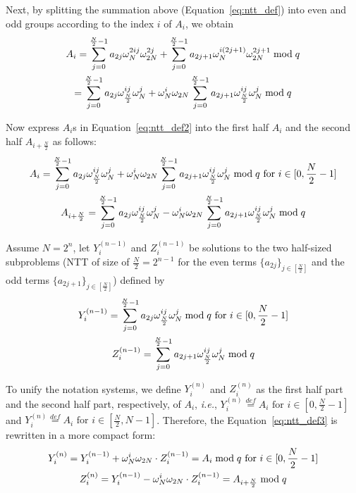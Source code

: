 \documentclass{iacrtrans}
\theoremstyle{plain}
\begin{document}
Next, by splitting the summation above (Equation~\ref{eq:ntt_def}) into even and odd groups according to the index $i$ of $A_i$, we obtain
\begin{gather}
    A_i = \sum_{j=0}^{\frac{N}{2}-1}a_{2j}\omega_N^{2ij}\omega_{2N}^{2j}  + \sum_{j=0}^{\frac{N}{2}-1}a_{2j+1}\omega_N^{i(2j+1)}\omega_{2N}^{2j+1} \bmod q \notag\\
    = \sum_{j=0}^{\frac{N}{2}-1}a_{2j}\omega_{\frac{N}{2}}^{ij}\omega_{N}^{j}  + \omega_{N}^i\omega_{2N}\sum_{j=0}^{\frac{N}{2}-1}a_{2j+1}\omega_{\frac{N}{2}}^{ij}\omega_N^{j} \bmod q \label{eq:ntt_def2}
\end{gather}


Now express $A_i$s in Equation~\ref{eq:ntt_def2} into the first half $A_{i}$ and the second half $A_{i+\frac{N}{2}}$ as follows: 
\begin{gather}
    A_i = \sum_{j=0}^{\frac{N}{2}-1}a_{2j}\omega_{\frac{N}{2}}^{ij}\omega_{N}^{j}  + \omega_{N}^i\omega_{2N}\sum_{j=0}^{\frac{N}{2}-1}a_{2j+1}\omega_{\frac{N}{2}}^{ij}\omega_N^{j} \bmod q \text{ for } i\in [0,\frac{N}{2}-1]\notag\\
   A_{i+\frac{N}{2}} = \sum_{j=0}^{\frac{N}{2}-1}a_{2j}\omega_{\frac{N}{2}}^{ij}\omega_{N}^{j}  - \omega_{N}^i\omega_{2N}\sum_{j=0}^{\frac{N}{2}-1}a_{2j+1}\omega_{\frac{N}{2}}^{ij}\omega_N^{j} \bmod q \label{eq:ntt_def3}
\end{gather}

Assume $N=2^n$, let $Y_i^{(n-1)}$ and $Z_i^{(n-1)}$ be solutions to the two half-sized subproblems (NTT of size of $\frac{N}{2}=2^{n-1}$ for the even terms $\{a_{2j}\}_{j\in [\frac{N}{2}]}$ and the odd terms $\{a_{2j+1}\}_{j\in [\frac{N}{2}]}$) defined by
\begin{gather}
    Y_i^{(n-1)} = \sum_{j=0}^{\frac{N}{2}-1}a_{2j}\omega_{\frac{N}{2}}^{ij}\omega_{N}^{j} \bmod q \text{ for } i\in [0,\frac{N}{2}-1]\notag\\
    Z_i^{(n-1)} = \sum_{j=0}^{\frac{N}{2}-1}a_{2j+1}\omega_{\frac{N}{2}}^{ij}\omega_N^{j} \bmod q \notag
\end{gather}

To unify the notation systems, we define $Y_i^{(n)}$ and $Z_i^{(n)}$ as the first half part and the second half part, respectively, of $A_i$, \textit{i.e.}, $Y_i^{(n)}\overset{def}{=} A_i \text{ for } i\in [0,\frac{N}{2}-1]$ and $Y_i^{(n)}\overset{def}{=} A_i \text{ for } i\in [\frac{N}{2},N-1]$. Therefore, the Equation~\ref{eq:ntt_def3} is rewritten in a more compact form:
\begin{gather}
    Y_i^{(n)} = Y_i^{(n-1)} + \omega_{N}^i\omega_{2N}\cdot Z_i^{(n-1)} = A_i\bmod q \text{ for } i\in [0,\frac{N}{2}-1]\notag\\
    Z_i^{(n)} = Y_i^{(n-1)} - \omega_{N}^i\omega_{2N}\cdot Z_i^{(n-1)} = A_{i+\frac{N}{2}} \bmod q \notag
\end{gather}
\end{document}
